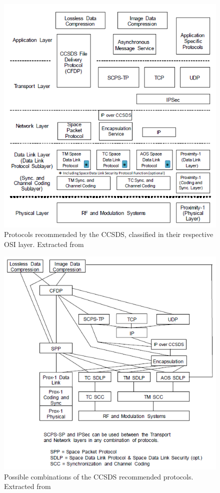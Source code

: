\begin{figure}[H]
\begin{center}
\includegraphics[scale=0.6]{SpaceSegment/Layer3/CCSDSprotocols.png}
\caption{Protocols recommended by the CCSDS, classified in their respective OSI layer. Extracted from \cite{CCSDSOverview}}
\end{center}
\end{figure}
\begin{figure}[H]
\begin{center}
\includegraphics[scale=0.6]{SpaceSegment/Layer3/CCSDScombinations.png}
\caption{Possible combinations of the CCSDS recommended protocols. Extracted from \cite{CCSDSOverview}}
\end{center}
\end{figure}
